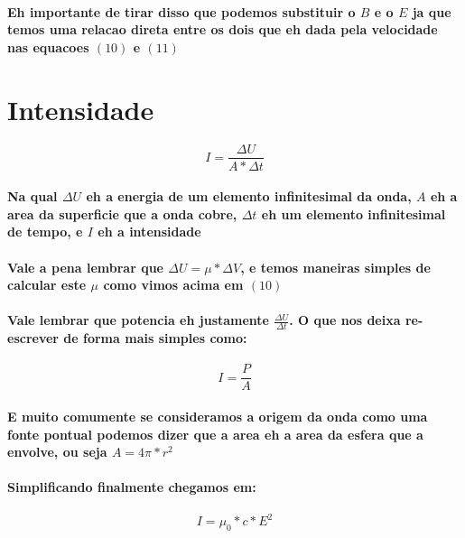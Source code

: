 \documentclass[12pt,twoside, a4paper, twocolumn]{article}
\begin{document}
\paragraph{Eh importante de tirar disso que podemos substituir o $B$ e o $E$ ja que temos uma relacao direta entre os dois que eh dada pela velocidade nas equacoes $(10)$ e $(11)$}

\section*{Intensidade}
\begin{equation}
    I = \frac{\Delta{U}}{A * \Delta{t}}
\end{equation}
\paragraph*{Na qual $\Delta{U}$ eh a energia de um elemento infinitesimal da onda, $A$ eh a area da superficie que a onda cobre, $\Delta{t}$ eh um elemento infinitesimal de tempo, e $I$ eh a intensidade}
\paragraph*{Vale a pena lembrar que $\Delta{U} = \mu * \Delta{V}$, e temos maneiras simples de calcular este $\mu$ como vimos acima em $(10)$}
\paragraph*{Vale lembrar que potencia eh justamente $\frac{\Delta{U}}{\Delta{t}}$. O que nos deixa re-escrever de forma mais simples como:}
\begin{equation}
    I = \frac{P}{A}
\end{equation}
\paragraph*{E muito comumente se consideramos a origem da onda como uma fonte pontual podemos dizer que a area eh a area da esfera que a envolve, ou seja $A = 4\pi * r^2$}
\paragraph*{Simplificando finalmente chegamos em:}
\begin{equation}
    I = \mu_0 * c * E^2
\end{equation}
\end{document}
